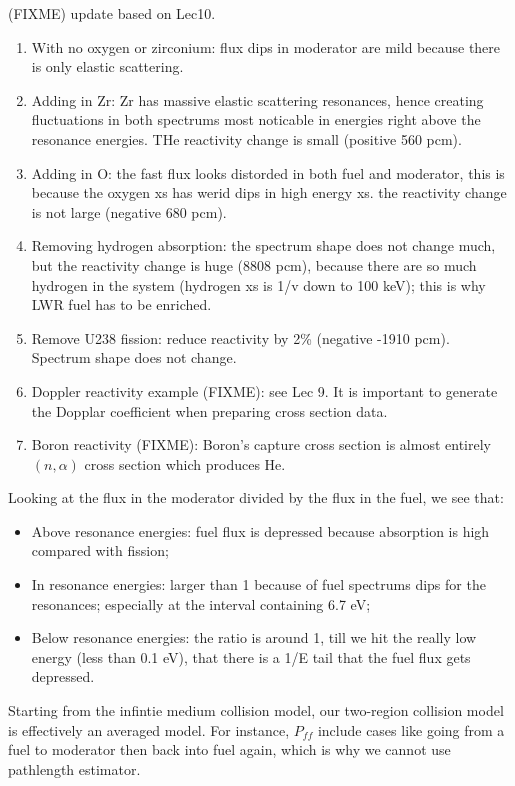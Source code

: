 \documentclass{school-22.211-notes}
\begin{document}
(FIXME) update based on Lec10. 
\begin{enumerate}
\item With no oxygen or zirconium: flux dips in moderator are mild because there is only elastic scattering. 
\item Adding in Zr: Zr has massive elastic scattering resonances, hence creating fluctuations in both spectrums most noticable in energies right above the resonance energies. THe reactivity change is small (positive 560 pcm).
\item Adding in O: the fast flux looks distorded in both fuel and moderator, this is because the oxygen xs has werid dips in high energy xs. the reactivity change is not large (negative 680 pcm). 
\item Removing hydrogen absorption: the spectrum shape does not change much, but the reactivity change is huge (8808 pcm), because there are so much hydrogen in the system (hydrogen xs is 1/v down to 100 keV); this is why LWR fuel has to be enriched. 
\item Remove U238 fission: reduce reactivity by 2\% (negative -1910 pcm). Spectrum shape does not change. 
\item Doppler reactivity example (FIXME): see Lec 9. It is important to generate the Dopplar coefficient when preparing cross section data. 
\item Boron reactivity (FIXME): Boron's capture cross section is almost entirely $(n,\alpha)$ cross section which produces He. 
\end{enumerate}

Looking at the flux in the moderator divided by the flux in the fuel, we see that:
\begin{itemize}
\item Above resonance energies: fuel flux is depressed because absorption is high compared with fission; 
\item In resonance energies: larger than 1 because of fuel spectrums dips for the resonances; especially at the interval containing 6.7 eV;
\item Below resonance energies: the ratio is around 1, till we hit the really low energy (less than 0.1 eV), that there is a 1/E tail that the fuel flux gets depressed. 
\end{itemize}

Starting from the infintie medium collision model, our two-region collision model is effectively an averaged model. For instance, $P_{ff}$ include cases like going from a fuel to moderator then back into fuel again, which is why we cannot use pathlength estimator. 
\end{document}
